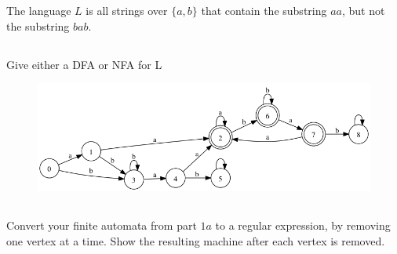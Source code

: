 \documentclass[paper=a4, fontsize=11pt]{scrartcl} %
\begin{document}
\maketitle %

\section{}

\begin{fancyquotes}
  The language $L$ is all strings over $\{a,b\}$ that contain the
  substring $aa$, but not the substring $bab$.
\end{fancyquotes}

\subsection{}
\begin{fancyquotes}
  Give either a DFA or NFA for L
\end{fancyquotes}

\begin{figure}[hp]
  \centering
  \includegraphics[width=\textwidth]{11-1.gv.png}
\end{figure}

\subsection{}
\begin{fancyquotes}
  Convert your finite automata from part $1a$ to a regular expression,
  by removing one vertex at a time. Show the resulting machine after
  each vertex is removed.
\end{fancyquotes}
\end{document}
